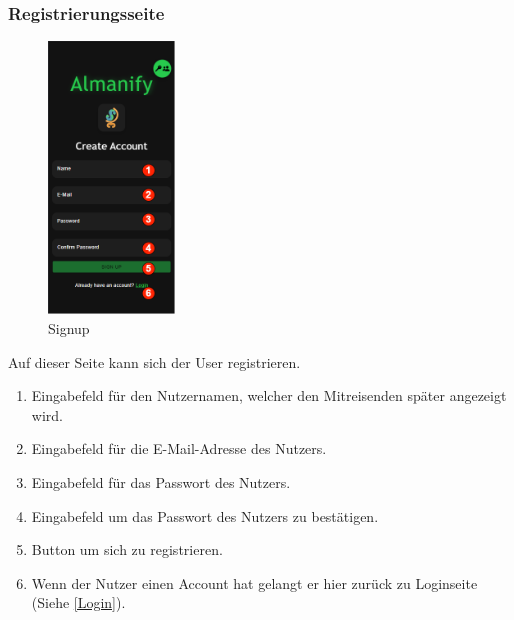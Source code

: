 \subsubsection{Registrierungsseite}\label{Signup}
\begin{figure}[H]
	\centering
	\includegraphics[width=0.3\textwidth]{img/pages_numbers/signup.drawio}
	\caption[Signup]{Signup}
	\label{fig:Signup}
\end{figure}

Auf dieser Seite kann sich der User registrieren.

\begin{enumerate}[label=\protect\circled{\arabic*}]
	\item Eingabefeld für den Nutzernamen, welcher den Mitreisenden später angezeigt wird.
	\item Eingabefeld für die E-Mail-Adresse des Nutzers.
	\item Eingabefeld für das Passwort des Nutzers.
	\item Eingabefeld um das Passwort des Nutzers zu bestätigen.
	\item Button um sich zu registrieren.
	\item Wenn der Nutzer einen Account hat gelangt er hier zurück zu Loginseite (Siehe \ref{Login}).
\end{enumerate}


